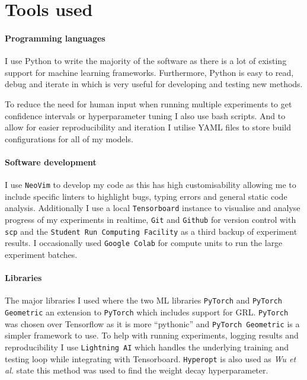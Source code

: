 \section{Tools used}


\paragraph{Programming languages}
I use Python to write the majority of the software as there is a lot of existing support for machine learning frameworks.
Furthermore, Python is easy to read, debug and iterate in which is very useful for developing and testing new methods.

To reduce the need for human input when running multiple experiments to get confidence intervals or hyperparameter tuning I also use bash scripts.
And to allow for easier reproducibility and iteration I utilise YAML files to store build configurations for all of my models.

\paragraph{Software development}

I use \texttt{NeoVim} to develop my code as this has high customisability allowing me to include specific linters to highlight bugs, typing errors and general static code analysis.
Additionally I use a local \texttt{Tensorboard} instance to visualise and analyse progress of my experiments in realtime, \texttt{Git} and \texttt{Github} for version control with \texttt{scp} and the \texttt{Student Run Computing Facility} as a third backup of experiment results.
I occasionally used \texttt{Google Colab} for compute units to run the large experiment batches.

\paragraph{Libraries}
\label{sec:libraries}

The major libraries I used where the two ML libraries \texttt{PyTorch} \cite{paszke2019pytorch} and \texttt{PyTorch Geometric} \cite{Fey/Lenssen/2019} an extension to \texttt{PyTorch} which includes support for GRL.
\texttt{PyTorch} was chosen over Tensorflow as it is more ``pythonic'' and \texttt{PyTorch Geometric} is a simpler framework to use.
To help with running experiments, logging results and reproducibility I use \texttt{Lightning AI} which handles the underlying training and testing loop while integrating with Tensorboard.
\texttt{Hyperopt} is also used as \textit{Wu et al.}\cite{wu2019simplifying} state this method was used to find the weight decay hyperparameter.

